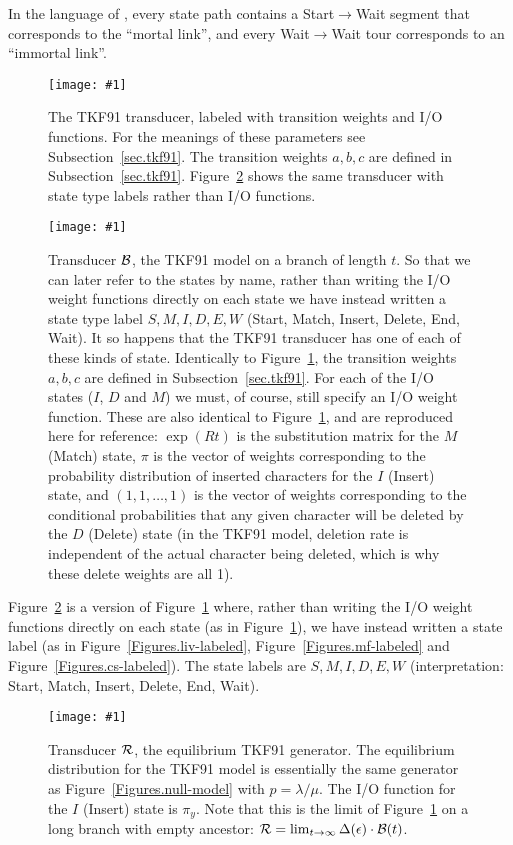 \documentclass{article}
\newcommand{\secref}[1]{Subsection~\ref{sec.#1}}
\newcommand{\figref}[1]{Figure~\ref{Figures.#1}}
\newcommand{\figlabel}[1]{\label{Figures.#1}}
\newcommand{\easyfig}[4]{
\begin{figure}
\texttt{[image: \#1]}
\caption{ \figlabel{#3} #4}
\end{figure}}
\newcommand{\pdffig}[2]{\easyfig{#1-fig.pdf}{}{#1}{#2}}
\newcommand\tkf{{\cal B}}
\newcommand\tkfroot{{\cal R}}
\newcommand\generate{\Delta}
\begin{document}
In the language of \cite{ThorneEtal91}, every state path contains a Start$\to$Wait segment that corresponds to the ``mortal link'',
and every Wait$\to$Wait tour corresponds to an ``immortal link''.

\pdffig{tkf91}{The TKF91 transducer, labeled with transition weights and I/O functions.  
For the meanings of these parameters see \secref{tkf91}. 
The transition weights $a,b,c$ are defined in \secref{tkf91}.
\figref{tkf91-labeled} shows the same transducer with state type labels rather than I/O functions. }



\pdffig{tkf91-labeled}{
Transducer $\tkf$, the TKF91 model on a branch of length $t$.
So that we can later refer to the states by name,
rather than writing the I/O weight functions directly on each state
we have instead written a state type label
 $S,M,I,D,E,W$ (Start, Match, Insert, Delete, End, Wait).
It so happens that the TKF91 transducer has one of each of these kinds of state.
Identically to \figref{tkf91}, the transition weights $a,b,c$ are defined in \secref{tkf91}.
For each of the I/O states ($I$, $D$ and $M$) we must, of course, still specify an I/O weight function.
These are also identical to \figref{tkf91}, and are reproduced here for reference:
 $\exp(Rt)$ is the substitution matrix for the $M$ (Match) state,
 $\pi$ is the vector of weights
  corresponding to the probability distribution of inserted characters for the $I$ (Insert) state,
 and
 $(1,1,\ldots,1)$
 is the vector of weights corresponding to
 the conditional probabilities that any given character will be deleted by the $D$ (Delete) state
 (in the TKF91 model, deletion rate is independent of the actual character being deleted,
 which is why these delete weights are all 1).
}

\figref{tkf91-labeled} is a version of \figref{tkf91}
where, rather than writing the I/O weight functions directly on each state (as in \figref{tkf91}),
we have instead written a state label (as in \figref{liv-labeled}, \figref{mf-labeled} and \figref{cs-labeled}).
The state labels are $S,M,I,D,E,W$ (interpretation: Start, Match, Insert, Delete, End, Wait).

\pdffig{tkf91-root}{Transducer $\tkfroot$, the equilibrium TKF91 generator.
The equilibrium distribution for the TKF91 model is essentially the same generator as \figref{null-model} with $p=\lambda/\mu$.
The I/O function for the $I$ (Insert) state is $\pi_y$.
Note that this is the limit of \figref{tkf91} on a long branch with empty ancestor:
$\tkfroot = \lim_{t\to\infty} \generate(\epsilon) \cdot \tkf(t)$.
}
\end{document}
